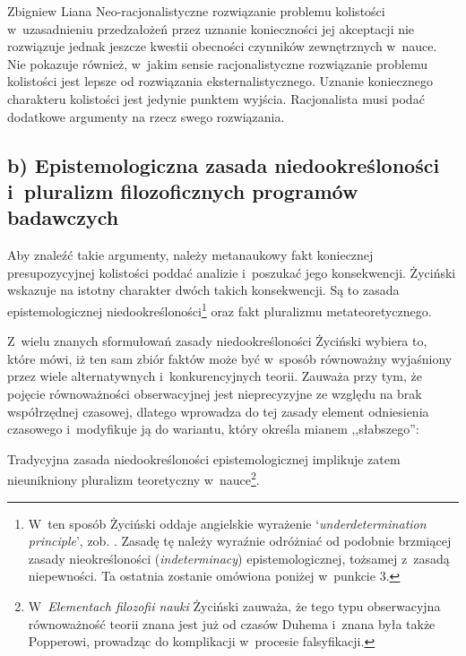 \begin{artplenv}{Zbigniew Liana}
Neo-racjonalistyczne rozwiązanie problemu kolistości w~uzasadnieniu przedzałożeń przez uznanie konieczności jej akceptacji nie rozwiązuje jednak jeszcze kwestii obecności czynników zewnętrznych w~nauce. Nie pokazuje również, w~jakim sensie racjonalistyczne rozwiązanie problemu kolistości jest lepsze od rozwiązania eksternalistycznego. Uznanie koniecznego charakteru kolistości jest jedynie punktem wyjścia. Racjonalista musi podać dodatkowe argumenty na rzecz swego rozwiązania.

\subsection{b) Epistemologiczna zasada niedookreśloności i~pluralizm filozoficznych programów badawczych}

Aby znaleźć takie argumenty, należy metanaukowy fakt koniecznej presupozycyjnej kolistości poddać analizie i~poszukać jego konsekwencji. Życiński wskazuje na istotny charakter dwóch takich konsekwencji. Są to zasada epistemologicznej niedookreśloności\footnote{W~ten sposób Życiński oddaje angielskie wyrażenie `\textit{underdetermination principle}', zob.
\parencite[][s.~129n]{zycinski_teizm_1985}. %
 Zasadę tę należy wyraźnie odróżniać od podobnie brzmiącej zasady nieokreśloności (\textit{indeterminacy}) epistemologicznej, tożsamej z~zasadą niepewności. Ta ostatnia zostanie omówiona poniżej w~punkcie 3.} oraz fakt pluralizmu metateoretycznego.

Z~wielu znanych sformułowań zasady niedookreśloności Życiński wybiera to, które mówi, iż ten sam zbiór faktów może być w~sposób równoważny wyjaśniony przez wiele alternatywnych i~konkurencyjnych teorii. Zauważa przy tym, że pojęcie równoważności obserwacyjnej jest nieprecyzyjne ze względu na brak współrzędnej czasowej, dlatego wprowadza do tej zasady element odniesienia czasowego i~modyfikuje ją do wariantu, który określa mianem ,,słabszego'':

Tradycyjna zasada niedookreśloności epistemologicznej implikuje zatem nieunikniony pluralizm teoretyczny w~nauce\footnote{W~\textit{Elementach filozofii nauki}
\parencites[][s.~106n]{zycinski_elementy_1996}[][s.~143]{zycinski_elementy_2015} %
 Życiński zauważa, że tego typu obserwacyjna równoważność teorii znana jest już od czasów Duhema i~znana była także Popperowi, prowadząc do komplikacji w~procesie falsyfikacji.}.


\end{artplenv}
